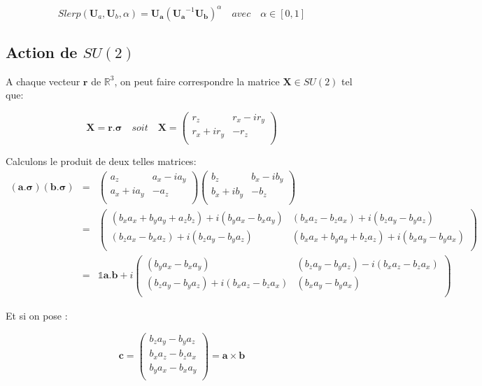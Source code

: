 \documentclass[12pt,a4paper]{article}
\newcommand{\unit}
{
\bm{\mathds{1}}
}
\begin{document}
\[
\boxed{Slerp(\bm{U}_a,\bm{U}_b,\alpha)= \bm{U_a}\left(\bm{U_a}^{-1} \bm{U_b}\right)^{\alpha} \quad avec\quad \alpha\in[0,1]}
\]


\newpage
\subsection{Action de $SU(2)$}

A chaque vecteur $\bm{r}$ de $\mathbb{R}^3$, on peut faire correspondre la matrice $\bm{X} \in SU(2)$ tel que:

\[
	\boxed{\bm{X}=\bm{r}.\bm{\sigma}} \quad soit \quad \bm{X}=\begin{pmatrix}
	r_z&r_x-i r_y\\
	r_x+i r_y&-r_z\\
	\end{pmatrix}
\]

Calculons le produit de deux telles matrices:
\begin{eqnarray*}
(\bm{a}.\bm{\sigma}) (\bm{b}.\bm{\sigma})&=&\begin{pmatrix}
a_z&a_x-i a_y\\
a_x+i a_y&-a_z\\
\end{pmatrix}
\begin{pmatrix}
b_z&b_x-i b_y\\
b_x+i b_y&-b_z\\
\end{pmatrix}\\
&=&
\begin{pmatrix}
(b_x a_x+ b_y a_y+a_z b_z)  +i (b_y a_x- b_x a_y)& (b_x a_z- b_z a_x) + i (b_z a_y- b_y a_z)  \\
(b_z a_x  - b_x a_z) + i(b_z a_y-b_y a_z)& (b_x a_x +b_y a_y+ b_z a_z)+ i (b_x a_y - b_y a_x )\\
\end{pmatrix}\\
&=&
\unit \bm{a}.\bm{b}+ i\begin{pmatrix}
(b_y a_x- b_x a_y)&   (b_z a_y- b_y a_z)-i(b_x a_z- b_z a_x)  \\
 (b_z a_y-b_y a_z)+i(b_x a_z - b_z a_x)& (b_x a_y - b_y a_x )\\
\end{pmatrix}
\end{eqnarray*}

Et si on pose :

\[
\bm{c}=\begin{pmatrix}
b_z a_y- b_y a_z\\
b_x a_z- b_z a_x\\
b_y a_x- b_x a_y\\
\end{pmatrix}= \bm{a}\times\bm{b}
\]
\end{document}
